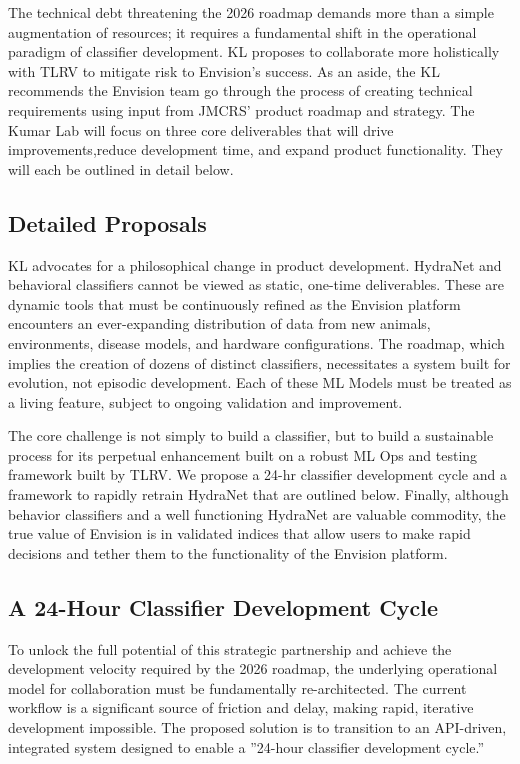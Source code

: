 \documentclass[11pt,a4paper]{article}
\begin{document}
The technical debt threatening the 2026 roadmap demands more than a simple augmentation of resources; it requires a fundamental shift in the operational paradigm of classifier development. KL proposes to collaborate more holistically with TLRV to mitigate risk to Envision’s success. As an aside, the KL recommends the Envision team go through the process of creating technical requirements using input from JMCRS’ product roadmap and strategy. The Kumar Lab will focus on three core deliverables that will drive improvements,reduce development time, and expand product functionality. They will each be outlined in detail below.

\subsection{Detailed Proposals}

KL advocates for a philosophical change in product development. HydraNet and behavioral classifiers cannot be viewed as static, one-time deliverables. These are dynamic tools that must be continuously refined as the Envision platform encounters an ever-expanding distribution of data from new animals, environments, disease models, and hardware configurations. The roadmap, which implies the creation of dozens of distinct classifiers, necessitates a system built for evolution, not episodic development. Each of these ML Models must be treated as a living feature, subject to ongoing validation and improvement. 

The core challenge is not simply to build a classifier, but to build a sustainable process for its perpetual enhancement built on a robust ML Ops and testing framework built by TLRV. We propose a 24-hr classifier development cycle and a framework to rapidly retrain HydraNet that are outlined below. Finally, although behavior classifiers and a well functioning HydraNet are valuable commodity, the true value of Envision is in validated indices that allow users to make rapid decisions and tether them to the functionality of the Envision platform.


\subsection{A 24-Hour Classifier Development Cycle}

To unlock the full potential of this strategic partnership and achieve the development velocity required by the 2026 roadmap, the underlying operational model for collaboration must be fundamentally re-architected. The current workflow is a significant source of friction and delay, making rapid, iterative development impossible. The proposed solution is to transition to an API-driven, integrated system designed to enable a ”24-hour classifier development cycle.”
\end{document}
